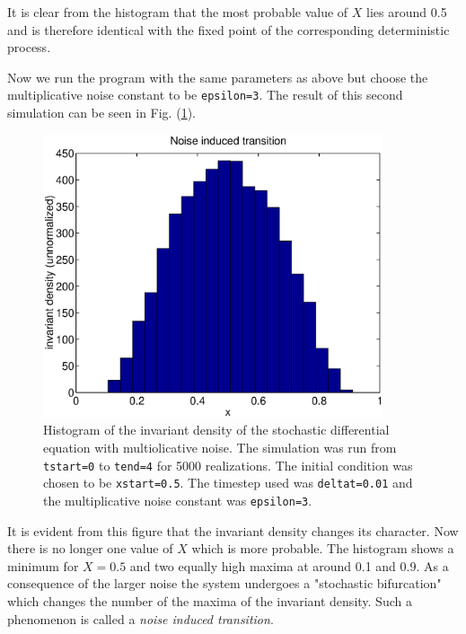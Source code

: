 It is clear from the histogram that the most probable value of $X$ 
lies around 0.5 and is therefore identical with the fixed point of 
the corresponding deterministic process.

Now we run the program with the same parameters as above but 
choose the multiplicative noise constant to be \texttt{epsilon=3}.
The result of this second simulation can be seen in Fig. 
(\ref{F_SDENOISEIN_2}).
\begin{figure}
\label{F_SDENOISEIN_2}
\includegraphics[width=10cm]{./Figures/f_sdenoisein_1.eps}
\caption{Histogram of the invariant density of the stochastic differential 
equation with multiolicative noise. The simulation was run from
\texttt{tstart=0} to \texttt{tend=4} for 5000 realizations.
The initial condition was chosen to be \texttt{xstart=0.5}.
The timestep used was \texttt{deltat=0.01} and the multiplicative noise 
constant was \texttt{epsilon=3}.} 
\end{figure}
It is evident from this figure that the invariant density changes 
its character. Now there is no longer one value of $X$ which is 
more probable. The histogram shows a minimum for $X=0.5$ and two 
equally high maxima at around 0.1 and 0.9. As a consequence of 
the larger noise the system undergoes a "stochastic bifurcation" 
which changes the number of the maxima of the invariant density. 
Such a phenomenon is called a {\em noise induced transition}.

